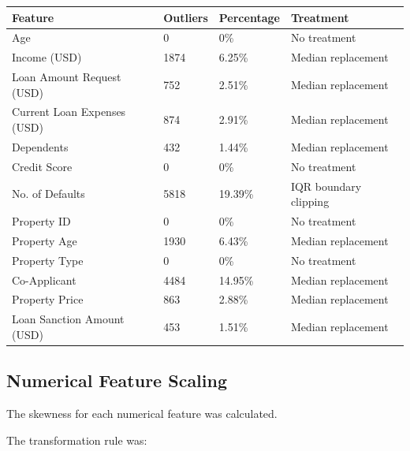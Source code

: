 \documentclass[12pt,a4paper]{article}
\begin{document}
\begin{longtable}{|p{5.2cm}|p{2.5cm}|p{2.5cm}|p{4.5cm}|}
\hline
\textbf{Feature} & \textbf{Outliers} & \textbf{Percentage} &
\textbf{Treatment} \\ \hline

Age & 0 & 0\% & No treatment \\ \hline

Income (USD) & 1874 & 6.25\% &
Median replacement \\ \hline

Loan Amount Request (USD) & 752 & 2.51\% &
Median replacement \\ \hline

Current Loan Expenses (USD) & 874 & 2.91\% &
Median replacement \\ \hline

Dependents & 432 & 1.44\% &
Median replacement \\ \hline

Credit Score & 0 & 0\% &
No treatment \\ \hline

No. of Defaults & 5818 & 19.39\% &
IQR boundary clipping \\ \hline

Property ID & 0 & 0\% &
No treatment \\ \hline

Property Age & 1930 & 6.43\% &
Median replacement \\ \hline

Property Type & 0 & 0\% &
No treatment \\ \hline

Co-Applicant & 4484 & 14.95\% &
Median replacement \\ \hline

Property Price & 863 & 2.88\% &
Median replacement \\ \hline

Loan Sanction Amount (USD) & 453 & 1.51\% &
Median replacement \\ \hline

\end{longtable}

\subsection{Numerical Feature Scaling}

The skewness for each numerical feature was calculated.

The transformation rule was:
\end{document}
